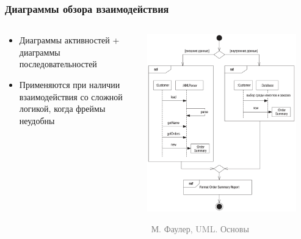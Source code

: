 \documentclass[xetex,mathserif,serif]{beamer}
\newcommand{\attribution}[1] {
    \vspace{-5mm}\begin{flushright}\begin{scriptsize}\textcolor{gray}{\textcopyright\, #1}\end{scriptsize}\end{flushright}
}
\begin{document}
    \begin{frame}
        \frametitle{Диаграммы обзора взаимодействия}
        \begin{columns}
            \begin{column}{0.5\textwidth}
                \begin{itemize}
                    \item Диаграммы активностей + диаграммы последовательностей
                    \item Применяются при наличии взаимодействия со сложной логикой, когда фреймы неудобны
                \end{itemize}
            \end{column}
            \begin{column}{0.5\textwidth}
                \begin{center}
                    \includegraphics[width=0.9\textwidth]{interactionOverviewDiagrams.png}
                    \attribution{М. Фаулер, UML. Основы}
                \end{center}
            \end{column}
        \end{columns}
    \end{frame}
\end{document}
